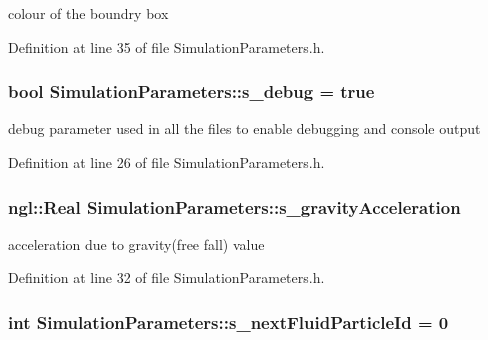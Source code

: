 colour of the boundry box 



Definition at line 35 of file SimulationParameters.h.

\hypertarget{class_simulation_parameters_a39c16940451c8d0ad3039112cf27f35c}{
\subsubsection[{s\_\-debug}]{\setlength{\rightskip}{0pt plus 5cm}bool {\bf SimulationParameters::s\_\-debug} = true}}
\label{class_simulation_parameters_a39c16940451c8d0ad3039112cf27f35c}


debug parameter used in all the files to enable debugging and console output 



Definition at line 26 of file SimulationParameters.h.

\hypertarget{class_simulation_parameters_aa1a876c641060bd6d04306cf5aaf37d1}{
\subsubsection[{s\_\-gravityAcceleration}]{\setlength{\rightskip}{0pt plus 5cm}ngl::Real {\bf SimulationParameters::s\_\-gravityAcceleration}}}
\label{class_simulation_parameters_aa1a876c641060bd6d04306cf5aaf37d1}


acceleration due to gravity(free fall) value 



Definition at line 32 of file SimulationParameters.h.

\hypertarget{class_simulation_parameters_a5d179885ab04a975dbc4f054b8ee22a1}{
\subsubsection[{s\_\-nextFluidParticleId}]{\setlength{\rightskip}{0pt plus 5cm}int {\bf SimulationParameters::s\_\-nextFluidParticleId} = 0}}
\label{class_simulation_parameters_a5d179885ab04a975dbc4f054b8ee22a1}


